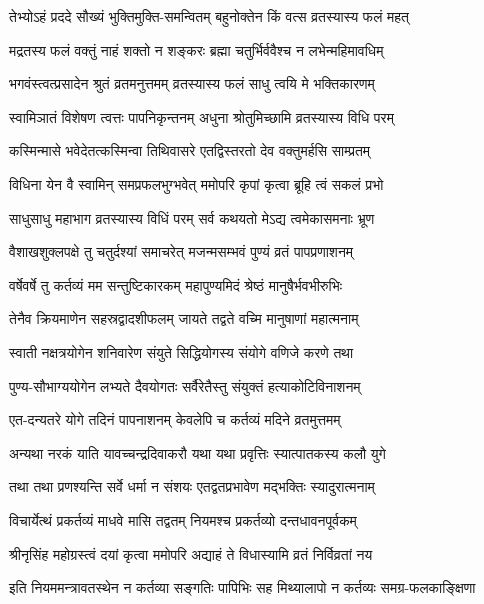 \twolineshloka
{तेभ्योऽहं प्रददे सौख्यं भुक्तिमुक्ति-समन्वितम्}
{बहुनोक्तेन किं वत्स व्रतस्यास्य फलं महत्} %

\twolineshloka
{मद्रतस्य फलं वक्तुं नाहं शक्तो न शङ्करः}
{ब्रह्मा चतुर्भिर्ववैश्च न लभेन्महिमावधिम्} %

\twolineshloka
{भगवंस्त्वत्प्रसादेन श्रुतं व्रतमनुत्तमम्}
{व्रतस्यास्य फलं साधु त्वयि मे भक्तिकारणम्} %

\twolineshloka
{स्वामिञातं विशेषण त्वत्तः पापनिकृन्तनम्}
{अधुना श्रोतुमिच्छामि व्रतस्यास्य विधि परम्} %

\twolineshloka
{कस्मिन्मासे भवेदेतत्कस्मिन्वा तिथिवासरे}
{एतद्विस्तरतो देव वक्तुमर्हसि साम्प्रतम्} %

\twolineshloka
{विधिना येन वै स्वामिन् समप्रफलभुग्भवेत्}
{ममोपरि कृपां कृत्वा ब्रूहि त्वं सकलं प्रभो} %


\twolineshloka
{साधुसाधु महाभाग व्रतस्यास्य विधिं परम्}
{सर्व कथयतो मेऽद्य त्वमेकासमनाः भ्रूण} %

\twolineshloka
{वैशाखशुक्लपक्षे तु चतुर्दश्यां समाचरेत्}
{मजन्मसम्भवं पुण्यं व्रतं पापप्रणाशनम्} %


\twolineshloka
{वर्षेवर्षे तु कर्तव्यं मम सन्तुष्टिकारकम्}
{महापुण्यमिदं श्रेष्ठं मानुषैर्भवभीरुभिः} %

\twolineshloka
{तेनैव क्रियमाणेन सहस्रद्वादशीफलम्}
{जायते तद्वते वच्मि मानुषाणां महात्मनाम्} %

\twolineshloka
{स्वाती नक्षत्रयोगेन शनिवारेण संयुते}
{सिद्धियोगस्य संयोगे वणिजे करणे तथा} %

\twolineshloka
{पुण्य-सौभाग्ययोगेन लभ्यते दैवयोगतः}
{सर्वैरेतैस्तु संयुक्तं हत्याकोटिविनाशनम्} %

\twolineshloka
{एत-दन्यतरे योगे तदिनं पापनाशनम्}
{केवलेपि च कर्तव्यं मदिने व्रतमुत्तमम्} %

\twolineshloka
{अन्यथा नरकं याति यावच्चन्द्रदिवाकरौ}
{यथा यथा प्रवृत्तिः स्यात्पातकस्य कलौ युगे} %

\twolineshloka
{तथा तथा प्रणश्यन्ति सर्वे धर्मा न संशयः}
{एतद्वतप्रभावेण मद्भक्तिः स्यादुरात्मनाम्} %


\twolineshloka
{विचार्येत्थं प्रकर्तव्यं माधवे मासि तद्वतम्}
{नियमश्च प्रकर्तव्यो दन्तधावनपूर्वकम्} %


\twolineshloka
{श्रीनृसिंह महोग्रस्त्वं दयां कृत्वा ममोपरि}
{अद्याहं ते विधास्यामि व्रतं निर्विव्रतां नय} %


\twolineshloka
{इति नियममन्त्रावतस्थेन न कर्तव्या सङ्गतिः पापिभिः सह}
{मिथ्यालापो न कर्तव्यः समग्र-फलकाङ्क्षिणा} %

